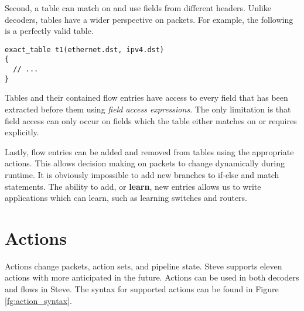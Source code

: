 Second, a table can match on and use fields from different headers. Unlike decoders, tables have a wider perspective on packets. For example, the following is a perfectly valid table. 

\begin{lstlisting}
exact_table t1(ethernet.dst, ipv4.dst)
{
  // ...
}
\end{lstlisting}

Tables and their contained flow entries have access to every field that has been extracted before them using \textit{field access expressions}. The only limitation is that field access can only occur on fields which the table either matches on or requires explicitly.

Lastly, flow entries can be added and removed from tables using the appropriate actions. This allows decision making on packets to change dynamically during runtime. It is obviously impossible to add new branches to if-else and match statements. The ability to add, or \textbf{learn}, new entries allows us to write applications which can learn, such as learning switches and routers.

\section{Actions} \label{tut:action}

Actions change packets, action sets, and pipeline state. Steve supports eleven actions with more anticipated in the future. Actions can be used in both decoders and flows in Steve. The syntax for supported actions can be found in Figure \ref{fg:action_syntax}.

